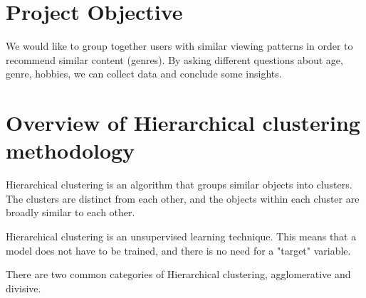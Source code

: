 \section{Project Objective}


    



    
 
  
      We would like to group together users with similar viewing patterns in order to recommend similar content (genres). By asking different questions about age, genre, hobbies, we can collect data and conclude some insights.

    

    

    


\section {Overview of Hierarchical clustering methodology}
Hierarchical clustering is an algorithm that groups similar objects into clusters. The clusters are distinct from each other, and the objects within each cluster are broadly similar to each other.

Hierarchical clustering is an unsupervised learning technique. This means that a model does not have to be trained, and there is no need for a "target" variable.

There are two common categories of Hierarchical clustering, agglomerative and divisive. 

